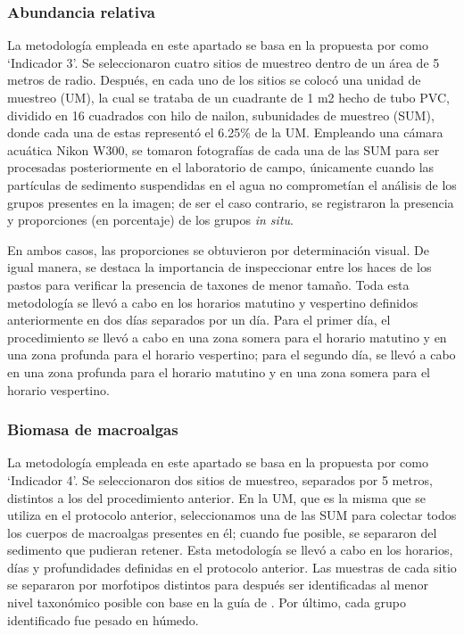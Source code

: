 \documentclass[
  authoryear,
  preprint,
  3p,
  twocolumn]{elsarticle}
\begin{document}
\subsubsection{Abundancia relativa}\label{abundancia-relativa}

La metodología empleada en este apartado se basa en la propuesta por
\citet{Botello2022} como `Indicador 3'. Se seleccionaron cuatro sitios
de muestreo dentro de un área de 5 metros de radio. Después, en cada uno
de los sitios se colocó una unidad de muestreo (UM), la cual se trataba
de un cuadrante de 1 m2 hecho de tubo PVC, dividido en 16 cuadrados con
hilo de nailon, subunidades de muestreo (SUM), donde cada una de estas
representó el 6.25\% de la UM. Empleando una cámara acuática Nikon W300,
se tomaron fotografías de cada una de las SUM para ser procesadas
posteriormente en el laboratorio de campo, únicamente cuando las
partículas de sedimento suspendidas en el agua no comprometían el
análisis de los grupos presentes en la imagen; de ser el caso contrario,
se registraron la presencia y proporciones (en porcentaje) de los grupos
\emph{in situ}.

En ambos casos, las proporciones se obtuvieron por determinación visual.
De igual manera, se destaca la importancia de inspeccionar entre los
haces de los pastos para verificar la presencia de taxones de menor
tamaño. Toda esta metodología se llevó a cabo en los horarios matutino y
vespertino definidos anteriormente en dos días separados por un día.
Para el primer día, el procedimiento se llevó a cabo en una zona somera
para el horario matutino y en una zona profunda para el horario
vespertino; para el segundo día, se llevó a cabo en una zona profunda
para el horario matutino y en una zona somera para el horario
vespertino.

\subsubsection{Biomasa de macroalgas}\label{biomasa-de-macroalgas}

La metodología empleada en este apartado se basa en la propuesta por
\citet{Botello2022} como `Indicador 4'. Se seleccionaron dos sitios de
muestreo, separados por 5 metros, distintos a los del procedimiento
anterior. En la UM, que es la misma que se utiliza en el protocolo
anterior, seleccionamos una de las SUM para colectar todos los cuerpos
de macroalgas presentes en él; cuando fue posible, se separaron del
sedimento que pudieran retener. Esta metodología se llevó a cabo en los
horarios, días y profundidades definidas en el protocolo anterior. Las
muestras de cada sitio se separaron por morfotipos distintos para
después ser identificadas al menor nivel taxonómico posible con base en
la guía de \citet{Littler1989}. Por último, cada grupo identificado fue
pesado en húmedo.
\end{document}
